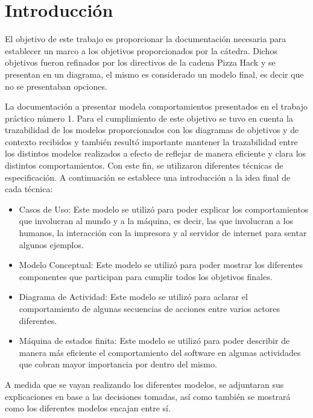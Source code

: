 \documentclass[a4paper,10pt]{article}
\begin{document}
\tableofcontents

\newpage


\section*{Introducci\'on}
El objetivo de este trabajo es proporcionar la documentaci\'on necesaria para establecer un marco a los objetivos proporcionados por la c\'atedra. Dichos objetivos fueron refinados por los directivos de la cadena Pizza Hack y se presentan en un diagrama, el mismo es considerado un modelo final, es decir que no se presentaban opciones. 

La documentaci\'on a presentar modela comportamientos presentados en el trabajo pr\'actico n\'umero 1.
Para el cumplimiento de este objetivo se tuvo en cuenta la trazabilidad de los modelos proporcionados con los diagramas de objetivos y de contexto recibidos y tambi\'en result\'o importante mantener la trazabilidad entre los distintos modelos realizados a efecto de reflejar de manera eficiente y clara los distintos comportamientos.
Con este fin, se utilizaron diferentes t\'ecnicas de especificaci\'on. A continuaci\'on se establece una introducci\'on a la idea final de cada t\'ecnica:
\begin{itemize}
\item Casos de Uso: Este modelo se utiliz\'o para poder explicar los comportamientos que involucran al mundo y a la m\'aquina, es decir, las que involucran a los humanos, la interacci\'on con la impresora y al servidor de internet para sentar algunos ejemplos.
\item Modelo Conceptual: Este modelo se utiliz\'o para poder mostrar los diferentes componentes que participan para cumplir todos los objetivos finales.
\item Diagrama de Actividad: Este modelo se utiliz\'o para aclarar el comportamiento de algunas secuencias de acciones entre varios actores diferentes.
\item M\'aquina de estados finita: Este modelo se utiliz\'o para poder describir de manera m\'as eficiente el comportamiento del software en algunas actividades que cobran mayor importancia por dentro del mismo.
\end{itemize}

A medida que se vayan realizando los diferentes modelos, se adjuntaran sus explicaciones en base a las decisiones tomadas, as\'i como tambi\'en se mostrar\'a como los diferentes modelos
encajan entre s\'i.
\end{document}
